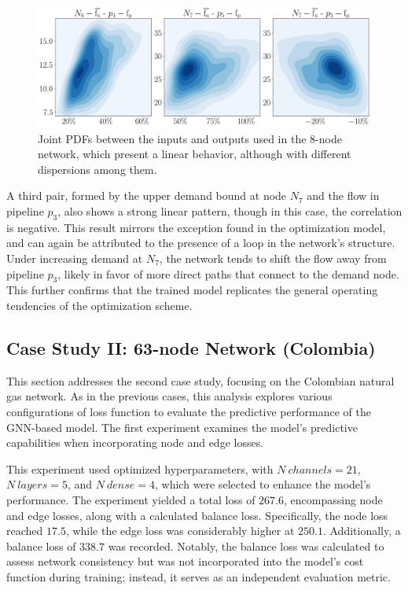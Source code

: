 \begin{figure}[htbp]
    \begin{center}
        \includegraphics[width=.7\textwidth]{figures/Chapter_NonLinealCensnet/inputs_outputs_2 KDE.png}
    \end{center}
    \caption{Joint PDFs between the inputs and outputs used in the 8-node network, which present a linear behavior, although with different dispersions among them. }
    \label{fig:joint_distributions_inputs_outputs_2_KDE}
\end{figure}

A third pair, formed by the upper demand bound at node $N_7$ and the flow in pipeline $p_3$, also shows a strong linear pattern, though in this case, the correlation is negative. This result mirrors the exception found in the optimization model, and can again be attributed to the presence of a loop in the network’s structure. Under increasing demand at $N_7$, the network tends to shift the flow away from pipeline $p_3$, likely in favor of more direct paths that connect to the demand node. This further confirms that the trained model replicates the general operating tendencies of the optimization scheme.





\subsection{Case Study II: 63-node Network (Colombia)}


This section addresses the second case study, focusing on the Colombian natural gas network. As in the previous cases, this analysis explores various configurations of loss function to evaluate the predictive performance of the GNN-based model. The first experiment examines the model's predictive capabilities when incorporating node and edge losses.

This experiment used optimized hyperparameters, with \( N \ channels = 21 \), \( N \ layers = 5 \), and \( N \ dense = 4 \), which were selected to enhance the model's performance. The experiment yielded a total loss of \( 267.6 \), encompassing node and edge losses, along with a calculated balance loss. Specifically, the node loss reached \( 17.5 \), while the edge loss was considerably higher at \( 250.1 \). Additionally, a balance loss of \( 338.7 \) was recorded. Notably, the balance loss was calculated to assess network consistency but was not incorporated into the model's cost function during training; instead, it serves as an independent evaluation metric. 


